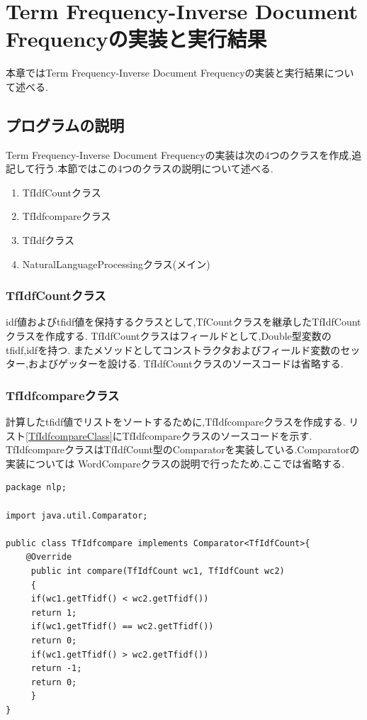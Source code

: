 \documentclass[a4j]{jarticle}
\begin{document}
\section{Term Frequency-Inverse Document Frequencyの実装と実行結果}
本章ではTerm Frequency-Inverse Document Frequencyの実装と実行結果について述べる.
\subsection{プログラムの説明}
Term Frequency-Inverse Document Frequencyの実装は次の4つのクラスを作成,追記して行う.本節ではこの4つのクラスの説明について述べる.
\begin{enumerate}
  \item TfIdfCountクラス
  \item TfIdfcompareクラス
  \item TfIdfクラス
  \item NaturalLanguageProcessingクラス(メイン)
\end{enumerate}

\subsubsection{TfIdfCountクラス}
idf値およびtfidf値を保持するクラスとして,TfCountクラスを継承したTfIdfCountクラスを作成する.
TfIdfCountクラスはフィールドとして,Double型変数のtfidf,idfを持つ.
またメソッドとしてコンストラクタおよびフィールド変数のセッター,およびゲッターを設ける.
TfIdfCountクラスのソースコードは省略する.

\subsubsection{TfIdfcompareクラス}
計算したtfidf値でリストをソートするために,TfIdfcompareクラスを作成する.
リスト\ref{TfIdfcompareClass}にTfIdfcompareクラスのソースコードを示す.
TfIdfcompareクラスはTfIdfCount型のComparatorを実装している.Comparatorの実装については
WordCompareクラスの説明で行ったため,ここでは省略する.
\begin{lstlisting}[basicstyle=\ttfamily\footnotesize, frame=single,label=TfIdfcompareClass,caption=TfIdfcompareクラスのソースコード]
package nlp;

import java.util.Comparator;

public class TfIdfcompare implements Comparator<TfIdfCount>{
	@Override
	 public int compare(TfIdfCount wc1, TfIdfCount wc2)
	 {
	 if(wc1.getTfidf() < wc2.getTfidf())
	 return 1;
	 if(wc1.getTfidf() == wc2.getTfidf())
	 return 0;
	 if(wc1.getTfidf() > wc2.getTfidf())
	 return -1;
	 return 0;
	 }
}
	\end{lstlisting}
\end{document}
